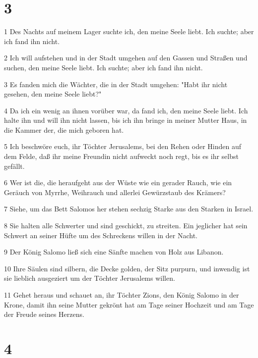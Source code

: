 \chapter{3}

\par 1 Des Nachts auf meinem Lager suchte ich, den meine Seele liebt. Ich suchte; aber ich fand ihn nicht.
\par 2 Ich will aufstehen und in der Stadt umgehen auf den Gassen und Straßen und suchen, den meine Seele liebt. Ich suchte; aber ich fand ihn nicht.
\par 3 Es fanden mich die Wächter, die in der Stadt umgehen: "Habt ihr nicht gesehen, den meine Seele liebt?"
\par 4 Da ich ein wenig an ihnen vorüber war, da fand ich, den meine Seele liebt. Ich halte ihn und will ihn nicht lassen, bis ich ihn bringe in meiner Mutter Haus, in die Kammer der, die mich geboren hat.
\par 5 Ich beschwöre euch, ihr Töchter Jerusalems, bei den Rehen oder Hinden auf dem Felde, daß ihr meine Freundin nicht aufweckt noch regt, bis es ihr selbst gefällt.
\par 6 Wer ist die, die heraufgeht aus der Wüste wie ein gerader Rauch, wie ein Geräuch von Myrrhe, Weihrauch und allerlei Gewürzstaub des Krämers?
\par 7 Siehe, um das Bett Salomos her stehen sechzig Starke aus den Starken in Israel.
\par 8 Sie halten alle Schwerter und sind geschickt, zu streiten. Ein jeglicher hat sein Schwert an seiner Hüfte um des Schreckens willen in der Nacht.
\par 9 Der König Salomo ließ sich eine Sänfte machen von Holz aus Libanon.
\par 10 Ihre Säulen sind silbern, die Decke golden, der Sitz purpurn, und inwendig ist sie lieblich ausgeziert um der Töchter Jerusalems willen.
\par 11 Gehet heraus und schauet an, ihr Töchter Zions, den König Salomo in der Krone, damit ihn seine Mutter gekrönt hat am Tage seiner Hochzeit und am Tage der Freude seines Herzens.

\chapter{4}

